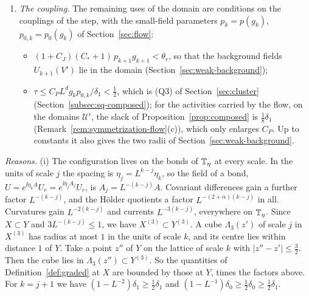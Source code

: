 \begin{remark}
\begin{enumerate}[label=(\roman*)]
\begin{itemize}
  \item the averaged contour variables of the step and the transports $\mathfrak G$ are defined and holomorphic at the base $W$, and at the configurations $e^{\ii Z}W$ with $|Z|_\infty\le r_I$ (Section~\ref{sec:step-quantities}).
  \end{itemize}
  So Theorem~\ref{thm:weak-bg}(a), (b), (d) and Propositions~\ref{prop:complex-ext}, \ref{prop:hessian-general} and~\ref{prop:gf-pieces} apply at $U'$, and Lemma~\ref{lem:eliminate} at its base.
\item \emph{The coupling.} The remaining uses of the domain are conditions on the couplings of the step, with the small-field parameters $p_k=p(g_k)$, $p_{0,k}=p_0(g_k)$ of Section~\ref{sec:flow}:
  \begin{itemize}
  \item $(1+C_J)(C_*+1)\,p_{k+1}g_{k+1}<\theta_r$, so that the background fields $U_{k+1}(V')$ lie in the domain (Section~\ref{sec:weak-background});
  \item $\tau\le C_PL^dg_kp_{0,k}/\delta_1<\frac12$, which is (Q3) of Section~\ref{sec:cluster} (Section~\ref{subsec:sq-composed}); for the activities carried by the flow, on the domains $\mathcal U^\flat$, the slack of Proposition~\ref{prop:composed} is $\frac18\delta_1$ (Remark~\ref{rem:symmetrization-flow}(c)), which only enlarges $C_P$. Up to constants it also gives the two radii of Section~\ref{sec:weak-background}.
  \end{itemize}
\end{enumerate}
\emph{Reasons.} (i) The configuration lives on the bonds of $\mathbb T_\eta$ at every scale. In the units of scale $j$ the spacing is $\eta_j=L^{k-j}\eta_k$, so the field of a bond, $U=e^{\ii\eta_kA}U_r=e^{\ii\eta_jA_j}U_r$, is $A_j=L^{-(k-j)}A$. Covariant differences gain a further factor $L^{-(k-j)}$, and the H\"older quotients a factor $L^{-(2+\alpha)(k-j)}$ in all. Curvatures gain $L^{-2(k-j)}$ and currents $L^{-3(k-j)}$, everywhere on $\mathbb T_\eta$. Since $X\subset Y$ and $3L^{-(k-j)}\le1$, we have $X^{(3)}\subset Y^{(3)}$. A cube $\Lambda_3(z')$ of scale $j$ in $X^{(3)}$ has radius at most $1$ in the units of scale $k$, and its centre lies within distance $1$ of $Y$. Take a point $z''$ of $Y$ on the lattice of scale $k$ with $|z''-z'|\le\frac32$. Then the cube lies in $\Lambda_3(z'')\subset Y^{(3)}$. So the quantities of Definition~\ref{def:graded} at $X$ are bounded by those at $Y$, times the factors above. For $k=j+1$ we have $(1-L^{-2})\delta_1\ge\frac12\delta_1$ and $(1-L^{-1})\delta_0\ge\frac12\delta_0\ge\frac12\delta_1$.


\end{remark}
